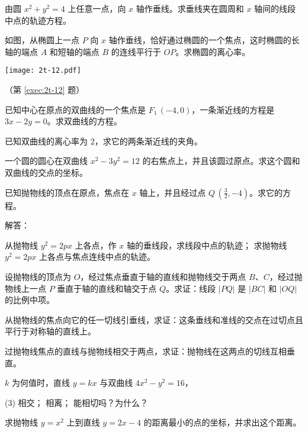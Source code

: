 \begin{question}
  \item 由圆 $x^2+y^2=4$ 上任意一点，向 $x$ 轴作垂线。求垂线夹在圆周和 $x$ 轴间的线段中点的轨迹方程。
  \item \label{exec:2t-12} 如图，从椭圆上一点 $P$ 向 $x$ 轴作垂线，恰好通过椭圆的一个焦点，这时椭圆的长轴的端点 $A$ 和短轴的端点 $B$ 的连线平行于 $OP$。求椭圆的离心率。
  \begin{figurehere}
    \begin{minipage}{\linewidth}\centering
      \texttt{[image: 2t-12.pdf]}
      \caption*{（第 \ref{exec:2t-12} 题）}
    \end{minipage}
  \end{figurehere}
  \item 已知中心在原点的双曲线的一个焦点是 $F_1\,(-4,0)$，一条渐近线的方程是 $3x-2y=0$。求双曲线的方程。
  \item 已知双曲线的离心率为 2，求它的两条渐近线的夹角。
  \item 一个圆的圆心在双曲线 $x^2-3y^2=12$ 的右焦点上，并且该圆过原点。求这个圆和双曲线的交点的坐标。
  \item 已知抛物线的顶点在原点，焦点在 $x$ 轴上，并且经过点 $Q\,\left(\frac{3}{2},-4\right)$。求它的方程。
  \item 解答：
  \begin{tasks}
    \task 从抛物线 $y^2=2px$ 上各点，作 $x$ 轴的垂线段，求线段中点的轨迹；
    \task 求抛物线 $y^2=2px$ 上各点与焦点连线中点的轨迹。
  \end{tasks}
  \item 设抛物线的顶点为 $O$，经过焦点垂直于轴的直线和抛物线交于两点 $B$、$C$，经过抛物线上一点 $P$ 垂直于轴的直线和轴交于点 $Q$。求证：线段 $|PQ|$ 是 $|BC|$ 和 $|OQ|$ 的比例中项。
  \item 从抛物线的焦点向它的任一切线引垂线，求证：这条垂线和准线的交点在过切点且平行于对称轴的直线上。
  \item 过抛物线焦点的直线与抛物线相交于两点，求证：抛物线在这两点的切线互相垂直。
  \item $k$ 为何值时，直线 $y = {kx}$ 与双曲线 $4x^2 - y^2 = {16}$，
  \begin{tasks}(3)
    \task 相交；
    \task 相离；
    \task 能相切吗？为什么？
  \end{tasks} 
  \item 求抛物线 $y=x^2$ 上到直线 $y=2x-4$ 的距离最小的点的坐标，并求出这个距离。
\end{question}
